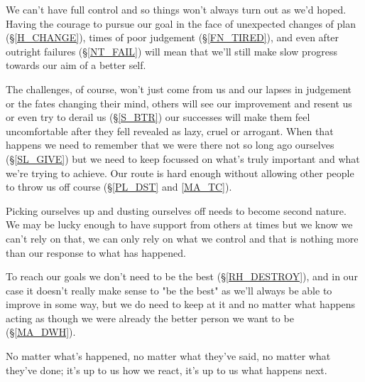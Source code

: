 \cleardoublepage
{\small

We can't have full control and so things won't always turn out as we'd hoped. Having the courage to pursue our goal in the face of unexpected changes of plan (\S \ref{H_CHANGE}), times of poor judgement (\S \ref{FN_TIRED}), and even after outright failures (\S \ref{NT_FAIL}) will mean that we'll still make slow progress towards our aim of a better self. 

The challenges, of course, won't just come from us and our lapses in judgement or the fates changing their mind, others will see our improvement and resent us or even try to derail us (\S \ref{S_BTR}) our successes will make them feel uncomfortable after they fell revealed as lazy, cruel or arrogant. When that happens we need to remember that we were there not so long ago ourselves (\S \ref{SL_GIVE}) but we need to keep focussed on what's truly important and what we're trying to achieve. Our route is hard enough without allowing other people to throw us off course (\S \ref{PL_DST} and \ref{MA_TC}).

Picking ourselves up and dusting ourselves off needs to become second nature. We may be lucky enough to have support from others at times but we know we can't rely on that, we can only rely on what we control and that is nothing more than our response to what has happened.

To reach our goals we don't need to be the best (\S \ref{RH_DESTROY}), and in our case it doesn't really make sense to "be the best" as we'll always be able to improve in some way, but we do need to keep at it and no matter what happens acting as though we were already the better person we want to be (\S \ref{MA_DWH}).

No matter what's happened, no matter what they've said, no matter what they've done; it's up to us how we react, it's up to us what happens next.

}
